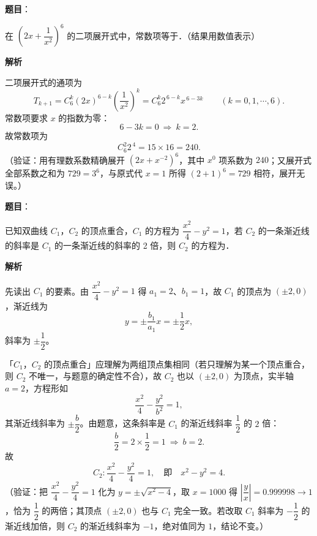 \begin{answer}

\textbf{题目}：

在 \(\left(2x+\dfrac{1}{x^{2}}\right)^{6}\) 的二项展开式中，常数项等于\gkblank{}．（结果用数值表示）

\textbf{解析}

二项展开式的通项为
\nopagebreak[4]
\[
T_{k+1}=C_{6}^{k}(2x)^{6-k}\left(\frac{1}{x^{2}}\right)^{k}=C_{6}^{k}2^{\,6-k}x^{\,6-3k}\qquad(k=0,1,\cdots,6).
\]
常数项要求 \(x\) 的指数为零：
\nopagebreak[4]
\[
6-3k=0\ \Longrightarrow\ k=2.
\]
故常数项为
\nopagebreak[4]
\[
C_{6}^{2}2^{\,4}=15\times16=240.
\]
（验证：用有理数系数精确展开 \((2x+x^{-2})^{6}\)，其中 \(x^{0}\) 项系数为 \(240\)；又展开式全部系数之和为 \(729=3^{6}\)，与原式代 \(x=1\) 所得 \((2+1)^{6}=729\) 相符，展开无误。）


\end{answer}
\begin{answer}

\textbf{题目}：

已知双曲线 \(C_{1}\)，\(C_{2}\) 的顶点重合，\(C_{1}\) 的方程为 \(\dfrac{x^{2}}{4}-y^{2}=1\)，若 \(C_{2}\) 的一条渐近线的斜率是 \(C_{1}\) 的一条渐近线的斜率的 2 倍，则 \(C_{2}\) 的方程为\gkblank{}．

\textbf{解析}

先读出 \(C_{1}\) 的要素。由 \(\dfrac{x^{2}}{4}-y^{2}=1\) 得 \(a_{1}=2\)、\(b_{1}=1\)，故 \(C_{1}\) 的顶点为 \((\pm2,0)\)，渐近线为
\nopagebreak[4]
\[
y=\pm\frac{b_{1}}{a_{1}}x=\pm\frac{1}{2}x,
\]
斜率为 \(\pm\dfrac{1}{2}\)。

「\(C_{1}\)，\(C_{2}\) 的顶点重合」应理解为两组顶点集相同（若只理解为某一个顶点重合，则 \(C_{2}\) 不唯一，与题意的确定性不合），故 \(C_{2}\) 也以 \((\pm2,0)\) 为顶点，实半轴 \(a=2\)，方程形如
\nopagebreak[4]
\[
\frac{x^{2}}{4}-\frac{y^{2}}{b^{2}}=1,
\]
其渐近线斜率为 \(\pm\dfrac{b}{2}\)。由题意，这条斜率是 \(C_{1}\) 的渐近线斜率 \(\dfrac{1}{2}\) 的 \(2\) 倍：
\nopagebreak[4]
\[
\frac{b}{2}=2\times\frac{1}{2}=1\ \Longrightarrow\ b=2.
\]
故
\nopagebreak[4]
\[
C_{2}:\frac{x^{2}}{4}-\frac{y^{2}}{4}=1,\quad\text{即}\quad x^{2}-y^{2}=4.
\]
（验证：把 \(\dfrac{x^{2}}{4}-\dfrac{y^{2}}{4}=1\) 化为 \(y=\pm\sqrt{x^{2}-4}\)，取 \(x=1000\) 得 \(\left|\dfrac{y}{x}\right|=0.999998\to1\)，恰为 \(\dfrac{1}{2}\) 的两倍；其顶点 \((\pm2,0)\) 也与 \(C_{1}\) 完全一致。若改取 \(C_{1}\) 斜率为 \(-\dfrac{1}{2}\) 的渐近线加倍，则 \(C_{2}\) 的渐近线斜率为 \(-1\)，绝对值同为 \(1\)，结论不变。）


\end{answer}
